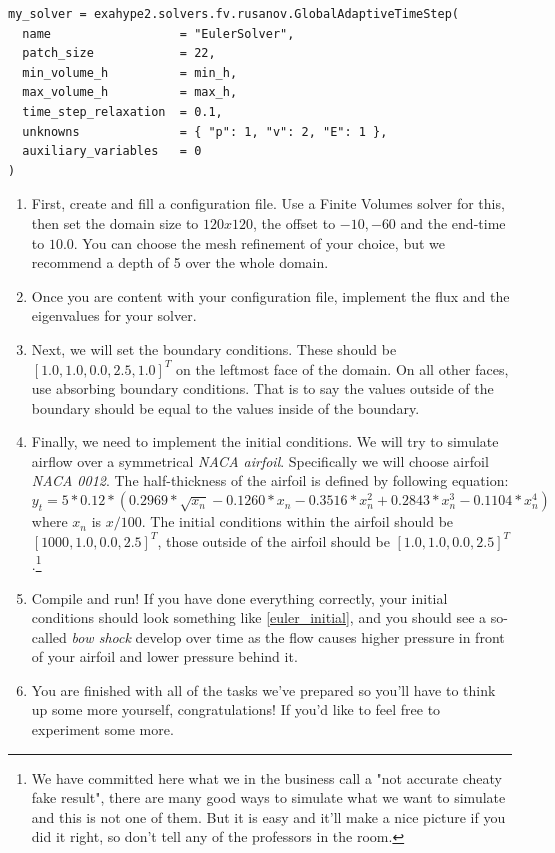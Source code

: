 \documentclass[12pt,letterpaper]{article}
\begin{document}
\begin{lstlisting}[style = Python]
my_solver = exahype2.solvers.fv.rusanov.GlobalAdaptiveTimeStep(
  name                  = "EulerSolver",
  patch_size            = 22,
  min_volume_h          = min_h,
  max_volume_h          = max_h,
  time_step_relaxation  = 0.1,
  unknowns              = { "p": 1, "v": 2, "E": 1 },
  auxiliary_variables   = 0
)
\end{lstlisting}

\begin{enumerate}
    \item
        First, create and fill a configuration file. Use a Finite Volumes solver for this, then set the domain size to $120x120$,
        the offset to $-10, -60$ and the end-time to $10.0$.
        You can choose the mesh refinement of your choice, but we recommend a depth of 5 over the whole domain.
    \item
        Once you are content with your configuration file, implement the flux and the eigenvalues for your solver.
    \item
        Next, we will set the boundary conditions. These should be $[1.0, 1.0, 0.0, 2.5, 1.0]^T$ on the leftmost face of the domain.
        On all other faces, use absorbing boundary conditions.
        That is to say the values outside of the boundary should be equal to the values inside of the boundary.
    \item
        Finally, we need to implement the initial conditions.
        We will try to simulate airflow over a symmetrical \textit{NACA airfoil}.
        Specifically we will choose airfoil \textit{NACA 0012}.
        The half-thickness of the airfoil is defined by following equation:
        \begin{equation}
            y_t = 5*0.12* ( 0.2969*\sqrt{x_n} - 0.1260*x_n - 0.3516*x_n^2 + 0.2843*x_n^3 - 0.1104*x_n^4 )
        \end{equation}
        where $x_n$ is $x/100$.
        The initial conditions within the airfoil should be $[1000, 1.0, 0.0, 2.5]^T$,
        those outside of the airfoil should be $[1.0, 1.0, 0.0, 2.5]^T$.\footnote{We have committed here what we in the business call a "not accurate cheaty fake result", there are many good ways to simulate what we want to simulate and this is not one of them. But it is easy and it'll make a nice picture if you did it right, so don't tell any of the professors in the room.}

    \item
        Compile and run! If you have done everything correctly, your initial conditions should look something like \ref{euler_initial},
        and you should see a so-called \textit{bow shock} develop over time as the flow causes higher pressure in front of your airfoil and lower pressure behind it.

    \item
        You are finished with all of the tasks we've prepared so you'll have to think up some more yourself, congratulations!
        If you'd like to feel free to experiment some more.
\end{enumerate}
\end{document}
